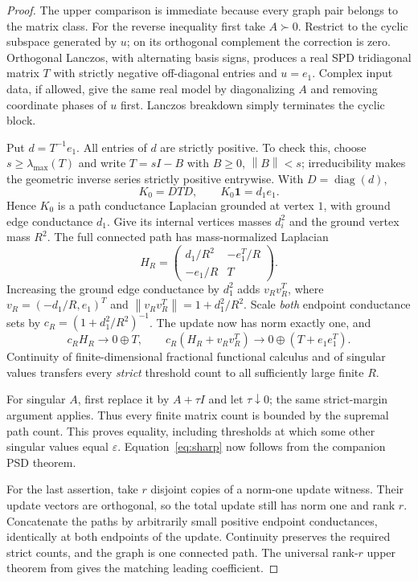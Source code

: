 \documentclass[11pt]{article}
\newcommand{\norm}[1]{\left\lVert#1\right\rVert}
\begin{document}
\begin{proof}
The upper comparison is immediate because every graph pair belongs to
the matrix class. For the reverse inequality first take $A\succ0$.
Restrict to the cyclic subspace generated by $u$; on its orthogonal
complement the correction is zero. Orthogonal Lanczos, with alternating
basis signs, produces a real SPD tridiagonal matrix $T$ with strictly
negative off-diagonal entries and $u=e_1$. Complex input data, if allowed,
give the same real model by diagonalizing $A$ and removing coordinate
phases of $u$ first. Lanczos breakdown simply terminates the cyclic block.

Put $d=T^{-1}e_1$. All entries of $d$ are strictly positive. To check
this, choose $s\ge\lambda_{\max}(T)$ and write $T=sI-B$ with
$B\ge0$, $\norm B<s$; irreducibility makes the geometric inverse series
strictly positive entrywise. With $D=\operatorname{diag}(d)$,
\[
 K_0=DTD,\qquad K_0\mathbf1=d_1 e_1.
\]
Hence $K_0$ is a path conductance Laplacian grounded at vertex $1$,
with ground edge conductance $d_1$. Give its internal vertices masses
$d_i^2$ and the ground vertex mass $R^2$. The full connected path has
mass-normalized Laplacian
\begin{equation}\label{eq:pathmatrix}
 H_R=\begin{pmatrix}d_1/R^2&-e_1^T/R\\-e_1/R&T\end{pmatrix}.
\end{equation}
Increasing the ground edge conductance by $d_1^2$ adds $v_Rv_R^T$,
where $v_R=(-d_1/R,e_1)^T$ and
$\norm{v_Rv_R^T}=1+d_1^2/R^2$.
Scale \emph{both} endpoint conductance sets by
$c_R=(1+d_1^2/R^2)^{-1}$. The update now has norm exactly one, and
\[
 c_RH_R\longrightarrow0\oplus T,\qquad
 c_R(H_R+v_Rv_R^T)\longrightarrow0\oplus(T+e_1e_1^T).
\]
Continuity of finite-dimensional fractional functional calculus and of
singular values transfers every \emph{strict} threshold count to all
sufficiently large finite $R$.

For singular $A$, first replace it by $A+\tau I$ and let $\tau\downarrow0$;
the same strict-margin argument applies. Thus every finite matrix count
is bounded by the supremal path count. This proves equality, including
thresholds at which some other singular values equal $\varepsilon$.
Equation~\eqref{eq:sharp} now follows from the companion PSD theorem.

For the last assertion, take $r$ disjoint copies of a norm-one update
witness. Their update vectors are orthogonal, so the total update still
has norm one and rank $r$. Concatenate the paths by arbitrarily small
positive endpoint conductances, identically at both endpoints of the
update. Continuity preserves the required strict counts, and the graph
is one connected path. The universal rank-$r$ upper theorem from
\cite{Companion} gives the matching leading coefficient.
\end{proof}
\end{document}
